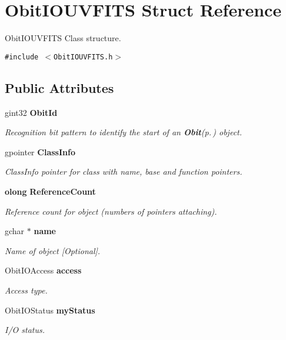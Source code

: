 \section{Obit\-IOUVFITS Struct Reference}
\label{structObitIOUVFITS}
Obit\-IOUVFITS Class structure.  


{\tt \#include $<$Obit\-IOUVFITS.h$>$}

\subsection*{Public Attributes}
\begin{CompactItemize}
\item 
gint32 {\bf Obit\-Id}
\begin{CompactList}\small\item\em Recognition bit pattern to identify the start of an {\bf Obit}{\rm (p.\,\pageref{structObit})} object. \item\end{CompactList}\item 
gpointer {\bf Class\-Info}
\begin{CompactList}\small\item\em Class\-Info pointer for class with name, base and function pointers. \item\end{CompactList}\item 
{\bf olong} {\bf Reference\-Count}
\begin{CompactList}\small\item\em Reference count for object (numbers of pointers attaching). \item\end{CompactList}\item 
gchar $\ast$ {\bf name}
\begin{CompactList}\small\item\em Name of object [Optional]. \item\end{CompactList}\item 
Obit\-IOAccess {\bf access}
\begin{CompactList}\small\item\em Access type. \item\end{CompactList}\item 
Obit\-IOStatus {\bf my\-Status}
\begin{CompactList}\small\item\em I/O status. \item\end{CompactList}\item 

\end{CompactItemize}
